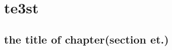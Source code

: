 \documentclass{book}
\begin{document}
\section{te3st}
\subsection[the title of chapter(section et.)]{the title of chapter(section et.)\protect{}}
\end{document}
